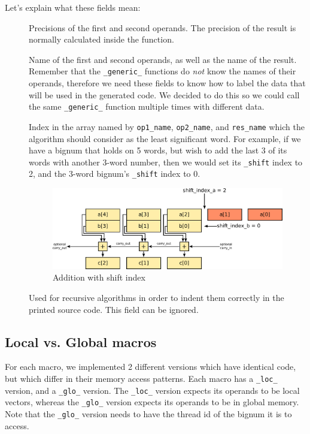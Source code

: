 \documentclass[10pt, a4paper]{report}
\begin{document}
Let's explain what these fields mean:
\begin{description}
\item[] Precisions of the first and second
operands. The precision of the result is normally calculated inside the
function.
\item[] Name of the first and second operands,
as well as the name of the result.
Remember that the \verb+_generic_+ functions do \emph{not} know the names of
their operands, therefore we need these fields to know how to label the data
that will be used in the generated code.
We decided to do this so we could call the same \verb+_generic_+ function
multiple times with different data.
\item[] Index in the array named by
\verb+op1_name+, \verb+op2_name+, and \verb+res_name+ which the
algorithm should consider as the least significant word.
For example, if we have a bignum that holds on 5 words, but wish to add the
last 3 of its words with another 3-word number, then we would set its
\verb+_shift+ index to 2, and the 3-word bignum's \verb+_shift+ index to 0.

\begin{figure}[h]
\centering
\includegraphics[width=\linewidth]{figs/addition_with_shift_index}
\caption{Addition with shift index}
\label{fig:addition_with_shift_index}
\end{figure}

\item[] Used for recursive algorithms in order to indent them
correctly in the printed source code.
This field can be ignored.
\end{description}

\subsection{Local vs. Global macros}
For each macro, we implemented 2 different versions which have identical code,
but which differ in their memory access patterns.
Each macro has a \verb+_loc_+ version, and a \verb+_glo_+ version.
The \verb+_loc_+ version expects its operands to be local vectors, whereas
the \verb+_glo_+ version expects its operands to be in global memory.
Note that the \verb+_glo_+ version needs to have the thread id of the bignum it
is to access.
\end{document}
